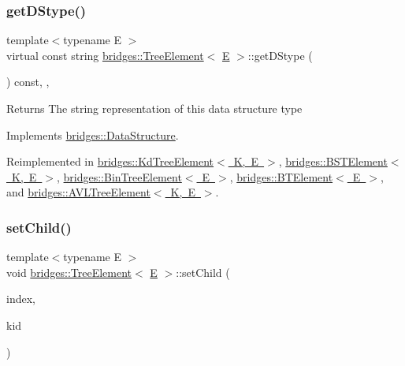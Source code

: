 \subsubsection{\texorpdfstring{getDStype()}{getDStype()}}
{\footnotesize\ttfamily template$<$typename E $>$ \\
virtual const string \mbox{\hyperlink{classbridges_1_1_tree_element}{bridges\+::\+Tree\+Element}}$<$ \mbox{\hyperlink{namespacebridges_acfb0a4f7877d8f63de3e6862004c50eda3a3ea00cfc35332cedf6e5e9a32e94da}{E}} $>$\+::get\+D\+Stype (\begin{DoxyParamCaption}{ }\end{DoxyParamCaption}) const\hspace{0.3cm}{\ttfamily [inline]}, {\ttfamily [override]}, {\ttfamily [virtual]}}

\begin{DoxyReturn}{Returns}
The string representation of this data structure type 
\end{DoxyReturn}


Implements \mbox{\hyperlink{classbridges_1_1_data_structure_a957a63b106e340bc753620c650632bdc}{bridges\+::\+Data\+Structure}}.



Reimplemented in \mbox{\hyperlink{classbridges_1_1_kd_tree_element_acdd8f989986b7dd42cfacec73cf52dcb}{bridges\+::\+Kd\+Tree\+Element$<$ K, E $>$}}, \mbox{\hyperlink{classbridges_1_1_b_s_t_element_af3843873c508c24f90b6e73a6f490bf8}{bridges\+::\+B\+S\+T\+Element$<$ K, E $>$}}, \mbox{\hyperlink{classbridges_1_1_bin_tree_element_a0a154f68ef0a58715e598a6ef92b9e59}{bridges\+::\+Bin\+Tree\+Element$<$ E $>$}}, \mbox{\hyperlink{classbridges_1_1_b_t_element_a43cc18d2c1e71c399782a306b60e4260}{bridges\+::\+B\+T\+Element$<$ E $>$}}, and \mbox{\hyperlink{classbridges_1_1_a_v_l_tree_element_a24c005f8e07a7a2682225cead3b7e364}{bridges\+::\+A\+V\+L\+Tree\+Element$<$ K, E $>$}}.

\mbox{\label{classbridges_1_1_tree_element_aa12cb7cb4b4f559bdf0967872b0a6e7d}} 
\subsubsection{\texorpdfstring{setChild()}{setChild()}}
{\footnotesize\ttfamily template$<$typename E $>$ \\
void \mbox{\hyperlink{classbridges_1_1_tree_element}{bridges\+::\+Tree\+Element}}$<$ \mbox{\hyperlink{namespacebridges_acfb0a4f7877d8f63de3e6862004c50eda3a3ea00cfc35332cedf6e5e9a32e94da}{E}} $>$\+::set\+Child (\begin{DoxyParamCaption}\item[{const size\+\_\+t \&}]{index,  }\item[{\mbox{\hyperlink{classbridges_1_1_tree_element}{Tree\+Element}}$<$ \mbox{\hyperlink{namespacebridges_acfb0a4f7877d8f63de3e6862004c50eda3a3ea00cfc35332cedf6e5e9a32e94da}{E}} $>$ $\ast$}]{kid }\end{DoxyParamCaption})\hspace{0.3cm}{\ttfamily [inline]}}

